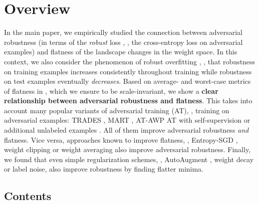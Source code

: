 \section{Overview}

In the main paper, we empirically studied the connection between adversarial robustness (in terms of the \emph{robust} loss \RCE, \ie, the cross-entropy loss on adversarial examples) and flatness of the \RCE landscape \wrt changes in the weight space. In this context, we also consider the phenomenon of robust overfitting \cite{RiceICML2020}, \ie, that robustness on training examples increases consistently throughout training while robustness on test examples eventually \emph{decreases}. Based on average- and worst-case metrics of flatness in \RCE, which we ensure to be scale-invariant,  we show a \textbf{clear relationship between adversarial robustness and flatness}. This takes into account many popular variants of adversarial training (AT), \ie, training on adversarial examples: TRADES \cite{ZhangICML2019}, MART \cite{WangICLR2020}, AT-AWP \cite{WuNIPS2020} AT with self-supervision \cite{HendrycksNIPS2019} or additional unlabeled examples \cite{CarmonNIPS2019}. All of them improve adversarial robustness \emph{and} flatness. Vice versa, approaches known to improve flatness, \eg, Entropy-SGD \cite{ChaudhariICLR2017}, weight clipping \cite{StutzMLSYS2021} or weight averaging \cite{GowalARXIV2020} also improve adversarial robustness. Finally, we found that even simple regularization schemes, \eg, AutoAugment \cite{CubukARXIV2018}, weight decay or label noise, also improve robustness by finding flatter minima.

\subsection{Contents}

